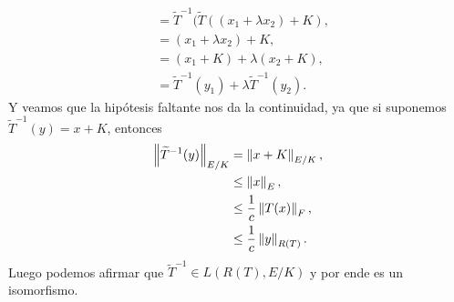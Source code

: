 \begin{homeworkProblem}
\begin{solution}
\begin{enumerate}[(i)]
\begin{enumerate}[(a)]
\begin{align*}
            &=\tilde{T}^{-1}(\tilde{T}((x_1+\lambda x_2)+K),\\
            &=(x_1+\lambda x_{2})+ K,\\
            &=(x_1+K)+\lambda (x_{2}+K),\\
            &=\tilde{T}^{-1}(y_1)+\lambda \tilde{T}^{-1}(y_2).
          \end{align*}
          Y veamos que la hipótesis faltante nos da la continuidad, ya que si suponemos $\tilde{T}^{-1}(y)=x+K$, entonces
          \begin{align*}
            \left\|\widetilde{T}^{-1}(y)\right\|_{E/K}&=\left\|x+K\right\|_{E/K},\\
            &\leq \left\|x\right\|_{E},\\
            &\leq \frac{1}{c}\left\|T(x)\right\|_{F},\\
            &\leq \frac{1}{c}\left\|y\right\|_{R(T)}.
          \end{align*}
          Luego podemos afirmar que $\tilde{T}^{-1}\in L(R(T),E/K)$ y por ende es un isomorfismo. 
      \end{enumerate}
    \end{enumerate}
  \end{solution}
\end{homeworkProblem}

